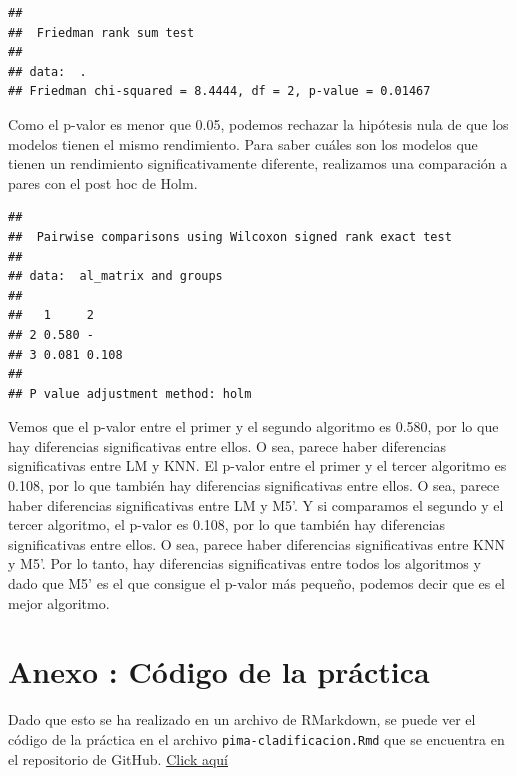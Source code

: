 \documentclass[
]{article}
\begin{document}
\begin{verbatim}
## 
##  Friedman rank sum test
## 
## data:  .
## Friedman chi-squared = 8.4444, df = 2, p-value = 0.01467
\end{verbatim}

Como el p-valor es menor que 0.05, podemos rechazar la hipótesis nula de
que los modelos tienen el mismo rendimiento. Para saber cuáles son los
modelos que tienen un rendimiento significativamente diferente,
realizamos una comparación a pares con el post hoc de Holm.

\begin{verbatim}
## 
##  Pairwise comparisons using Wilcoxon signed rank exact test 
## 
## data:  al_matrix and groups 
## 
##   1     2    
## 2 0.580 -    
## 3 0.081 0.108
## 
## P value adjustment method: holm
\end{verbatim}

Vemos que el p-valor entre el primer y el segundo algoritmo es 0.580,
por lo que hay diferencias significativas entre ellos. O sea, parece
haber diferencias significativas entre LM y KNN. El p-valor entre el
primer y el tercer algoritmo es 0.108, por lo que también hay
diferencias significativas entre ellos. O sea, parece haber diferencias
significativas entre LM y M5'. Y si comparamos el segundo y el tercer
algoritmo, el p-valor es 0.108, por lo que también hay diferencias
significativas entre ellos. O sea, parece haber diferencias
significativas entre KNN y M5'. Por lo tanto, hay diferencias
significativas entre todos los algoritmos y dado que M5' es el que
consigue el p-valor más pequeño, podemos decir que es el mejor
algoritmo.

\hypertarget{anexo-cuxf3digo-de-la-pruxe1ctica}{%
\section{Anexo : Código de la
práctica}\label{anexo-cuxf3digo-de-la-pruxe1ctica}}

Dado que esto se ha realizado en un archivo de RMarkdown, se puede ver
el código de la práctica en el archivo \texttt{pima-cladificacion.Rmd}
que se encuentra en el repositorio de GitHub.
\href{https://github.com/DanelArias-Dreyton257/DATCOM-Intro}{Click aquí}
\end{document}
